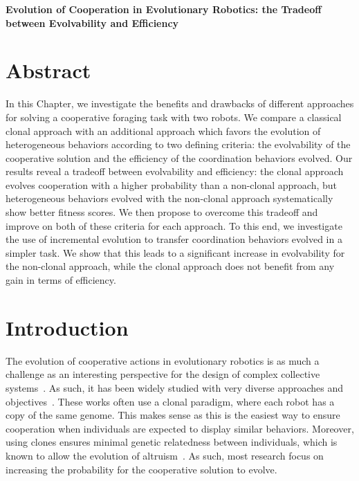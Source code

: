 \clearpage

\begin{flushleft}
\textbf{\Huge Evolution of Cooperation in Evolutionary Robotics: the Tradeoff between Evolvability and Efficiency}
\end{flushleft}

\section{Abstract}
  In this Chapter, we investigate the benefits and drawbacks of different approaches for solving a cooperative foraging task with two robots. We compare a classical clonal approach with an additional approach which favors the evolution of heterogeneous behaviors according to two defining criteria: the evolvability of the cooperative solution and the efficiency of the coordination behaviors evolved. Our results reveal a tradeoff between evolvability and efficiency: the clonal approach evolves cooperation with a higher probability than a non-clonal approach, but heterogeneous behaviors evolved with the non-clonal approach systematically show better fitness scores. We then propose to overcome this tradeoff and improve on both of these criteria for each approach. To this end, we investigate the use of incremental evolution to transfer coordination behaviors evolved in a simpler task. We show that this leads to a significant increase in evolvability for the non-clonal approach, while the clonal approach does not benefit from any gain in terms of efficiency.


\section{Introduction}

  The evolution of cooperative actions in evolutionary robotics is as much a challenge as an interesting perspective for the design of complex collective systems~\parencite{Doncieux2015a}. As such, it has been widely studied with very diverse approaches and objectives~\parencite{Waibel2009, Hauert2014, Trianni2007b, Lichocki2013}. These works often use a clonal paradigm, where each robot has a copy of the same genome. This makes sense as this is the easiest way to ensure cooperation when individuals are expected to display similar behaviors. Moreover, using clones ensures minimal genetic relatedness between individuals, which is known to allow the evolution of altruism~\parencite{Waibel2011, Montanier2011}. As such, most research focus on increasing the probability for the cooperative solution to evolve.

